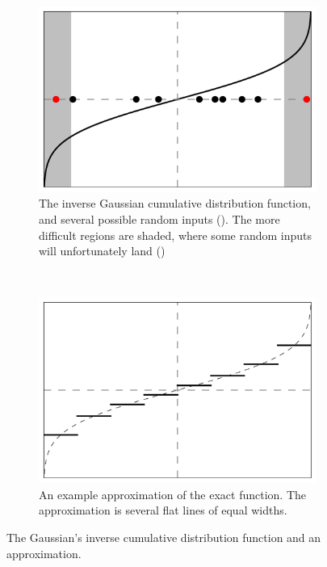 \documentclass[11pt,a4paper,twoside,english]{extarticle}
\begin{document}
\begin{figure}[htb]
\centering
\begin{subfigure}[t]{0.45\linewidth}
\centering
\includegraphics[width=\linewidth]{inverse_cdf_function_tails_simplified}
\begin{minipage}[t]{0.9\linewidth}
\caption{The inverse Gaussian cumulative distribution function, and several possible random inputs (\CIRCLE). The more difficult regions are shaded, where some random inputs will unfortunately land ({\color{red}\CIRCLE})}
\label{fig:inverse_cdf_function_tails_simplified}
\end{minipage}
\end{subfigure}%
~
\begin{subfigure}[t]{0.45\linewidth}
\centering
\includegraphics[width=\linewidth]{inverse_cdf_uniform_discretisation_unshaded_simplified}
\begin{minipage}[t]{0.9\linewidth}
\caption{An example approximation of the exact function. The approximation is several flat lines of equal widths.}
\label{fig:inverse_cdf_uniform_discretisation_unshaded_simplified}
\end{minipage}
\end{subfigure}
\caption{The Gaussian's inverse cumulative distribution function and an approximation.}
\label{fig:gaussian_inverse_cdf}
\end{figure}
\end{document}
